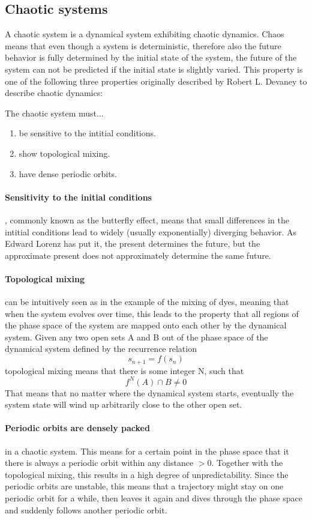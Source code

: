 \documentclass[main]{subfiles}
\begin{document}
\subsection{Chaotic systems}

A chaotic system is a dynamical system exhibiting chaotic dynamics. Chaos means that even though a system is deterministic, therefore also the future behavior is fully determined by the initial state of the system, the future of the system can not be predicted if the initial state is slightly varied. This property is one of the following three properties originally described by Robert L. Devaney to describe chaotic dynamics:

The chaotic system must...
\begin{enumerate}
\item be sensitive to the intitial conditions.
\item show topological mixing.
\item have dense periodic orbits.
\end{enumerate}

\paragraph{Sensitivity to the initial conditions}, commonly known as the butterfly effect, means that small differences in the intitial conditions lead to widely (usually exponentially) diverging behavior. As Edward Lorenz has put it, the present determines the future, but the approximate present does not approximately determine the same future.

\paragraph{Topological mixing} can be intuitively seen as in the example of the mixing of dyes, meaning that when the system evolves over time, this leads to the property that all regions of the phase space of the system are mapped onto each other by the dynamical system. Given any two open sets A and B out of the phase space of the dynamical system defined by the recurrence relation \[s_{n+1} = f(s_n)\] topological mixing means that there is some integer N, such that \[f^N(A) \cap B \neq 0\] That means that no matter where the dynamical system starts, eventually the system state will wind up arbitrarily close to the other open set.

\paragraph{Periodic orbits are densely packed} in a chaotic system. This means for a certain point in the phase space that it there is always a periodic orbit within any distance \(> 0\). Together with the topological mixing, this results in a high degree of unpredictability. Since the periodic orbits are unstable, this means that a trajectory might stay on one periodic orbit for a while, then leaves it again and dives through the phase space and suddenly follows another periodic orbit.
\end{document}
